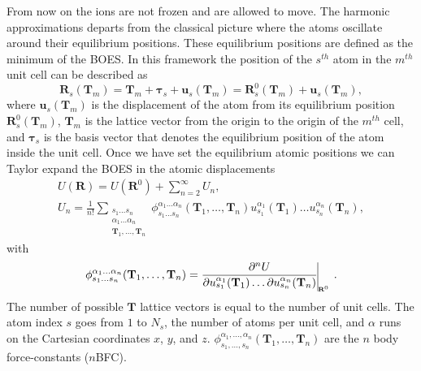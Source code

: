 From now on the ions are not frozen and are allowed to move. The harmonic approximations departs from the classical picture where the atoms oscillate around their equilibrium positions. These equilibrium positions are defined as 
the minimum of the BOES. In this framework the position of the $s^{th}$ atom in the $m^{th}$ unit cell can be described as
\begin{equation}
 \mathbf{R}_{s}(\mathbf{T}_{m})=\mathbf{T}_{m}+\boldsymbol{\tau}_{s}+\mathbf{u}_{s}(\mathbf{T}_{m})=\mathbf{R}_{s}^{0}(\mathbf{T}_{m})+\mathbf{u}_{s}(\mathbf{T}_{m}),
\end{equation}  
where $\mathbf{u}_{s}(\mathbf{T}_{m})$ is the displacement of the atom from its equilibrium position $\mathbf{R}_{s}^{0}(\mathbf{T}_{m})$, $\mathbf{T}_{m}$ is the lattice vector from the origin to the origin of the $m^{th}$ 
cell, and $\boldsymbol{\tau}_{s}$ is the basis vector that denotes the equilibrium position of the atom inside the unit cell. Once we have set the equilibrium atomic positions we can Taylor expand the BOES in the atomic displacements
\begin{multline}
 \label{taylor-expansion}
 U(\mathbf{R})=U(\mathbf{R}^{0})+\sum_{n=2}^{\infty}U_{n}, \\ U_{n}=\frac{1}{n!}\sum\limits_{\substack{s_{1}\dots s_{n} \\ \alpha_{1}\dots\alpha_{n} \\ \mathbf{T}_{1},\dots,\mathbf{T}_{n}}} 
 \phi_{s_{1}\dots s_{n}}^{\alpha_{1}\dots\alpha_{n}}(\mathbf{T}_{1},\dots,\mathbf{T}_{n})u_{s_{1}}^{\alpha_{1}}(\mathbf{T}_{1})\dots u_{s_{n}}^{\alpha_{n}}(\mathbf{T}_{n}),
\end{multline}
with
\begin{equation}
 \label{perturbative-nbfc}
 \phi_{s_{1}\dots s_{n}}^{\alpha_{1}\dots\alpha_{n}}(\mathbf{T}_{1},\dots,\mathbf{T}_{n})=\frac{\partial^{n}U}{\partial u_{s_{1}}^{\alpha_{1}}(\mathbf{T}_{1})\dots\partial u_{s_{n}}^{
 \alpha_{n}}(\mathbf{T}_{n})}\vline_{_{_{_{_{_{_{_{_{\mathbf{R}^{0}}}}}}}}}}.
\end{equation}
The number of possible $\mathbf{T}$ lattice vectors is equal to the number of unit cells. The atom index $s$ goes from $1$ to $N_{s}$, the number of atoms per unit cell, and $\alpha$ runs on the Cartesian coordinates $x$, $y$, and 
$z$. $\phi_{s_{1},\dots,s_{n}}^{\alpha_{1},\dots,\alpha_{n}}(\mathbf{T}_{1},\dots,\mathbf{T}_{n})$ are the $n$ body force-constants ($n$BFC). \\

